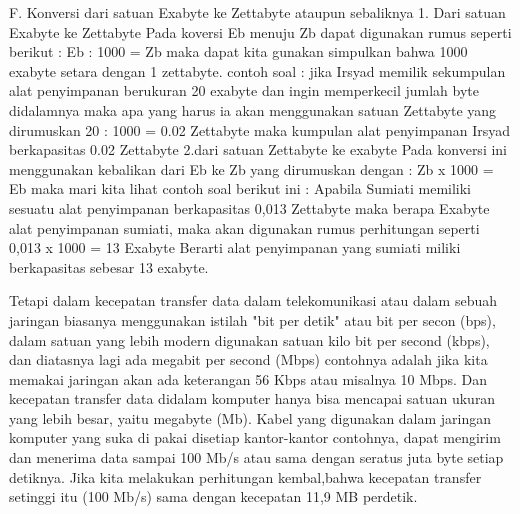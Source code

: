 F. Konversi dari satuan Exabyte ke Zettabyte ataupun sebaliknya
1. Dari satuan Exabyte ke Zettabyte
Pada koversi Eb menuju Zb dapat digunakan rumus seperti berikut :
Eb : 1000 = Zb
maka dapat kita gunakan simpulkan bahwa 1000 exabyte setara dengan 1 zettabyte.
contoh soal :
jika Irsyad memilik sekumpulan alat penyimpanan berukuran 20 exabyte dan ingin memperkecil jumlah byte didalamnya maka apa yang harus ia akan menggunakan satuan Zettabyte yang dirumuskan
20 : 1000 = 0.02 Zettabyte
maka kumpulan alat penyimpanan Irsyad berkapasitas 0.02 Zettabyte
2.dari satuan Zettabyte ke exabyte
Pada konversi ini menggunakan kebalikan dari Eb ke Zb yang dirumuskan dengan :
Zb x 1000 = Eb
maka mari kita lihat contoh soal berikut ini :
Apabila Sumiati memiliki sesuatu alat penyimpanan berkapasitas 0,013 Zettabyte maka berapa Exabyte alat penyimpanan sumiati, maka akan digunakan rumus perhitungan seperti
0,013 x 1000 = 13 Exabyte
Berarti alat penyimpanan yang sumiati miliki berkapasitas sebesar 13 exabyte.

Tetapi dalam kecepatan transfer data dalam telekomunikasi atau dalam sebuah jaringan biasanya menggunakan istilah "bit per detik" atau
bit per secon (bps), dalam satuan yang lebih modern digunakan satuan kilo bit per second (kbps), dan diatasnya lagi ada megabit per second (Mbps)
contohnya adalah jika kita memakai jaringan akan ada keterangan 56 Kbps atau misalnya 10 Mbps. Dan kecepatan transfer data didalam komputer hanya bisa mencapai satuan ukuran yang lebih besar, yaitu megabyte (Mb). Kabel yang digunakan dalam jaringan komputer yang suka di pakai disetiap kantor-kantor  contohnya, dapat mengirim dan menerima data sampai 100 Mb/s atau sama dengan seratus juta byte setiap detiknya. Jika kita melakukan perhitungan kembal,bahwa kecepatan transfer setinggi itu (100 Mb/s) sama dengan kecepatan 11,9 MB perdetik.


